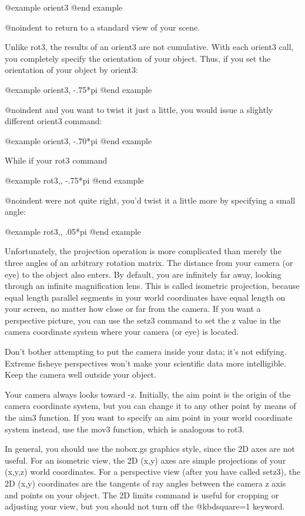 @example
orient3
@end example

@noindent
to return to a standard view of your scene.

Unlike rot3, the results of an orient3 are not cumulative.  With each
orient3 call, you completely specify the orientation of your object.
Thus, if you set the orientation of your object by orient3:

@example
orient3, -.75*pi
@end example

@noindent
and you want to twist it just a little, you would issue a slightly
different orient3 command:

@example
orient3, -.70*pi
@end example

While if your rot3 command

@example
rot3,, -.75*pi
@end example

@noindent
were not quite right, you'd twist it a little more by specifying a
small angle:

@example
rot3,, .05*pi
@end example

Unfortunately, the projection operation is more complicated than
merely the three angles of an arbitrary rotation matrix.  The distance
from your camera (or eye) to the object also enters.  By default, you
are infinitely far away, looking through an infinite magnification
lens.  This is called isometric projection, because equal length
parallel segments in your world coordinates have equal length on your
screen, no matter how close or far from the camera.  If you want a
perspective picture, you can use the setz3 command to set the z
value in the camera coordinate system where your camera (or eye) is
located.

Don't bother attempting to put the camera inside your data; it's not
edifying.  Extreme fisheye perspectives won't make your scientific
data more intelligible.  Keep the camera well outside your object.

Your camera always looks toward -z.  Initially, the aim point is the
origin of the camera coordinate system, but you can change it to any
other point by means of the aim3 function.  If you want to specify an
aim point in your world coordinate system instead, use the mov3
function, which is analogous to rot3.

In general, you should use the nobox.gs graphics style, since the 2D
axes are not useful.  For an isometric view, the 2D (x,y) axes are
simple projections of your (x,y,z) world coordinates.  For a
perspective view (after you have called setz3), the 2D (x,y)
coordinates are the tangents of ray angles between the camera z axis
and points on your object.  The 2D limits command is useful for
cropping or adjusting your view, but you should not turn off the
@kbd{square=1} keyword.

